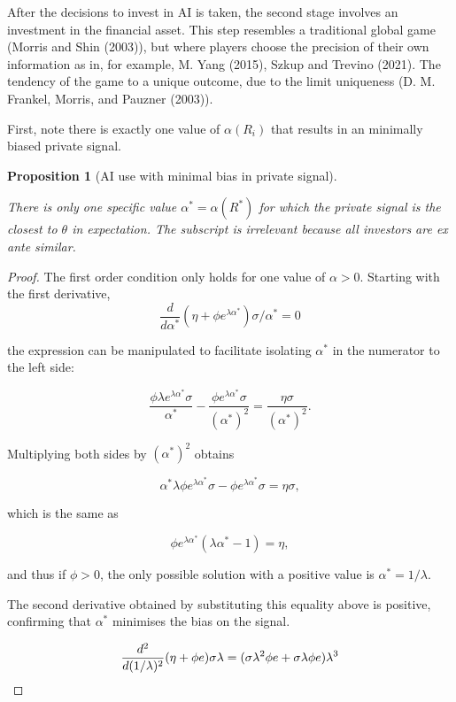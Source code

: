 \documentclass[
]{article}
\theoremstyle{plain}
\newtheorem{proposition}{Proposition}[section]
\theoremstyle{remark}
\begin{document}
After the decisions to invest in AI is taken, the second stage involves
an investment in the financial asset. This step resembles a traditional
global game (Morris and Shin (2003)), but where players choose the
precision of their own information as in, for example, M. Yang (2015),
Szkup and Trevino (2021). The tendency of the game to a unique outcome,
due to the limit uniqueness (D. M. Frankel, Morris, and Pauzner (2003)).

First, note there is exactly one value of \(\alpha(R_i)\) that results
in an minimally biased private signal.

\begin{proposition}[AI use with minimal bias in private
signal]\protect\hypertarget{prp-alphainvestunbiased}{}\label{prp-alphainvestunbiased}

There is only one specific value \(\alpha^* = \alpha(R^*)\) for which
the private signal is the closest to \(\theta\) in expectation. The
subscript is irrelevant because all investors are ex ante similar.

\end{proposition}

\begin{proof}
The first order condition only holds for one value of \(\alpha > 0\).
Starting with the first derivative, \[
\frac{d}{d \alpha^*} (\eta + \phi e^{\lambda \alpha^*}) \sigma / \alpha^* = 0
\]

the expression can be manipulated to facilitate isolating \(\alpha^*\)
in the numerator to the left side:

\[
\frac{\phi \lambda e^{\lambda \alpha^*} \sigma}{\alpha^*} - \frac{\phi e^{\lambda \alpha^*}\sigma}{(\alpha^*)^2} = \frac{\eta \sigma}{(\alpha^*)^2}.
\]

Multiplying both sides by \((\alpha^*)^2\) obtains

\[
\alpha^* \lambda \phi e^{\lambda \alpha^*} \sigma - \phi e^{\lambda \alpha^*}\sigma = \eta \sigma,
\]

which is the same as

\[
\phi e^{\lambda \alpha^*} (\lambda \alpha^* - 1)= \eta,
\]

and thus if \(\phi > 0\), the only possible solution with a positive
value is \(\alpha^* = 1/\lambda\).

The second derivative obtained by substituting this equality above is
positive, confirming that \(\alpha^*\) minimises the bias on the signal.

\[
\frac{d^2}{d (1/\lambda)^2} (\eta + \phi e) \sigma \lambda = (\sigma \lambda^2 \phi e + \sigma \lambda \phi e)\lambda^3 \\
\]
\end{proof}
\end{document}
